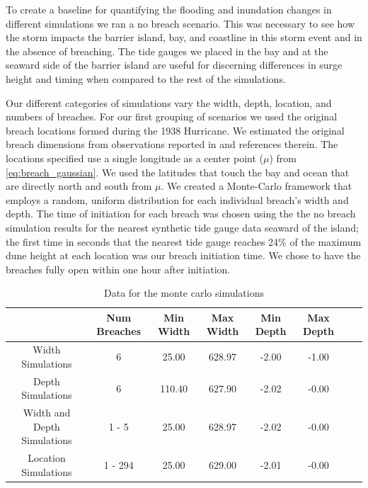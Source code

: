\documentclass{coastal_paper}
\begin{document}
To create a baseline for quantifying the flooding and inundation changes in different simulations we ran a no breach scenario. This was necessary to see how the storm impacts the barrier island, bay, and coastline in this storm event and in the absence of breaching. The tide gauges we placed in the bay and at the seaward side of the barrier island are useful for discerning differences in surge height and timing when compared to the rest of the simulations.

Our different categories of simulations vary the width, depth, location, and numbers of breaches. For our first grouping of scenarios we used the original breach locations formed during the 1938 Hurricane. We estimated the original breach dimensions from observations reported in \citet{Canizares2008} and references therein. The locations specified use a single longitude as a center point ($\mu$) from \ref{eq:breach_gaussian}. We used the latitudes that touch the bay and ocean that are directly north and south from $\mu$. We created a Monte-Carlo framework that employs a random, uniform distribution for each individual breach's width and depth. The time of initiation for each breach was chosen using the the no breach simulation results for the nearest synthetic tide gauge data seaward of the island; the first time in seconds that the nearest tide gauge reaches 24\% of the maximum dune height at each location was our breach initiation time. We chose to have the breaches fully open within one hour after initiation.

\begin{table}
\begin{tabular}{cccccccc}
\toprule
{} & Num Breaches & Min Width & Max Width & Min Depth & Max Depth \\
\midrule
Width Simulations         &            6 &     25.00 &    628.97 &     -2.00 &     -1.00 \\
Depth Simulations         &            6 &    110.40 &    627.90 &     -2.02 &     -0.00 \\
Width and Depth Simulations &        1 - 5 &     25.00 &    628.97 &     -2.02 &     -0.00 \\
Location Simulations    &      1 - 294 &     25.00 &    629.00 &     -2.01 &     -0.00 \\
\bottomrule
\end{tabular}
\caption{Data for the monte carlo simulations}
\label{table:1}
\end{table}
\end{document}
